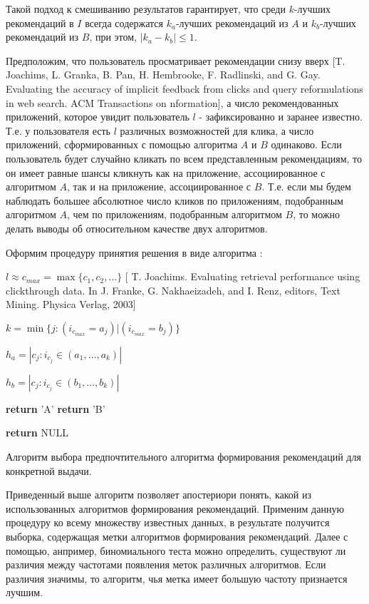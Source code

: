 \documentclass[12pt,a4paper]{report}
\begin{document}
Такой подход к смешиванию результатов гарантирует, что среди $k$-лучших рекомендаций в $I$ всегда содержатся $k_a$-лучших рекомендаций из $A$ и $k_b$-лучших рекомендаций из $B$, при этом, $|k_a-k_b| \le 1$.

Предположим, что пользователь просматривает рекомендации снизу вверх [T. Joachims, L. Granka, B. Pan, H. Hembrooke, F. Radlinski, and G. Gay. Evaluating the accuracy of implicit feedback from clicks and query reformulations in web search. ACM Transactions on nformation], а число рекомендованных приложений, которое увидит пользователь $l$ - зафиксированно и заранее известно. Т.е. у пользователя есть $l$ различных возможностей для клика, а число приложений, сформированных с помощью алгоритма $A$ и $B$ одинаково. Если пользователь будет случайно кликать по всем представленным рекомендациям, то он имеет равные шансы кликнуть как на приложение, ассоциированное с алгоритмом $A$, так и на приложение, ассоциированное с $B$. Т.е. если мы будем наблюдать большее абсолютное число кликов по приложениям, подобранным алгоритмом $A$, чем по приложениям, подобранным алгоритмом $B$, то можно делать выводы об относительном качестве двух алгоритмов.

Оформим процедуру принятия решения в виде алгоритма \cite{Td}:


\begin{algorithm}[H]
\SetAlgoLined
{}
$l \approx c_{max} = \max\{c_1,c_2,\dots\}$ [ T. Joachims. Evaluating retrieval performance using clickthrough data. In J. Franke, G. Nakhaeizadeh, and I. Renz, editors, Text Mining. Physica Verlag, 2003]

$k = \min\{j: (i_{c_{max}} = a_j) | (i_{c_{max}} = b_j)\}$

$h_a = |{c_j: i_{c_j} \in (a_1, \dots, a_k)}|$

$h_b = |{c_j: i_{c_j} \in (b_1, \dots, b_k)}|$

 {
\textbf{return} 'A'
}
 {
\textbf{return} 'B'
}

\textbf{return} NULL

\caption{Алгоритм выбора предпочтительного алгоритма формирования рекомендаций для конкретной выдачи.}
\label{alg:CBI}
\end{algorithm}

Приведенный выше алгоритм позволяет апостериори понять, какой из использованных алгоритмов формирования рекомендаций.
Применим данную процедуру ко всему множеству известных данных, в результате получится выборка, содержащая метки алгоритмов формирования рекомендаций. Далее с помощью, анпример, биномиального теста можно определить, существуют ли различия между частотами появления меток различных алгоритмов. Если различия значимы, то алгоритм, чья метка имеет большую частоту признается лучшим.
\end{document}
